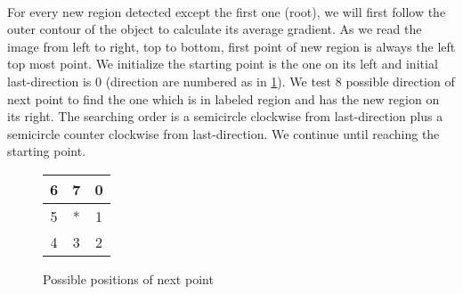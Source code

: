 \paragraph{} For every new region detected except the first one (root), we will first follow the outer contour of the object to calculate its average gradient. As we read the image from left to right, top to bottom, first point of new region is always the left top most point. We initialize the starting point is the one on its left and initial last-direction is 0 (direction are numbered as in \ref{directionToSearch}). We test 8 possible direction of next point to find the one which is in labeled region and has the new region on its right. The searching order is a semicircle clockwise from last-direction plus a semicircle counter clockwise from last-direction. We continue until reaching the starting point. 
\begin{figure}
\begin{tabular}{|c|c|c|}
\hline 
6 & 7 & 0 \\ 
\hline 
5 & * & 1 \\ 
\hline 
4 & 3 & 2 \\ 
\hline 
\end{tabular}  
\centering
\caption{Possible positions of next point}
\label{directionToSearch}
\end{figure}
